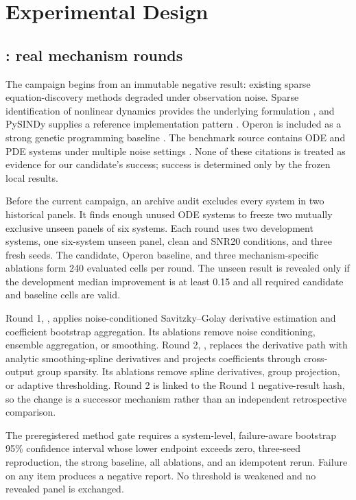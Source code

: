 \section{Experimental Design}

\subsection{\routea{}: real mechanism rounds}

The campaign begins from an immutable negative result: existing sparse
equation-discovery methods degraded under observation noise. Sparse
identification of nonlinear dynamics provides the underlying formulation
\cite{brunton2016sindy}, and PySINDy supplies a reference implementation
pattern \cite{desilva2020pysindy}. Operon is included as a strong genetic
programming baseline \cite{burlacu2020operon}. The benchmark source contains
ODE and PDE systems under multiple noise settings
\cite{ziaei2025mdbench}. None of these citations is treated as evidence for
our candidate's success; success is determined only by the frozen local
results.

Before the current campaign, an archive audit excludes every system in two
historical panels. It finds enough unused ODE systems to freeze two mutually
exclusive unseen panels of six systems. Each round uses two development
systems, one six-system unseen panel, clean and SNR20 conditions, and three
fresh seeds. The candidate, Operon baseline, and three mechanism-specific
ablations form 240 evaluated cells per round. The unseen result is revealed
only if the development median improvement is at least 0.15 and all required
candidate and baseline cells are valid.

Round 1, , applies
noise-conditioned Savitzky--Golay derivative estimation and coefficient
bootstrap aggregation. Its ablations remove noise conditioning, ensemble
aggregation, or smoothing. Round 2,
, replaces the derivative path with
analytic smoothing-spline derivatives and projects coefficients through
cross-output group sparsity. Its ablations remove spline derivatives, group
projection, or adaptive thresholding. Round 2 is linked to the Round 1
negative-result hash, so the change is a successor mechanism rather than an
independent retrospective comparison.

The preregistered method gate requires a system-level, failure-aware bootstrap
95\% confidence interval whose lower endpoint exceeds zero, three-seed
reproduction, the strong baseline, all ablations, and an idempotent rerun.
Failure on any item produces a negative report. No threshold is weakened and
no revealed panel is exchanged.

